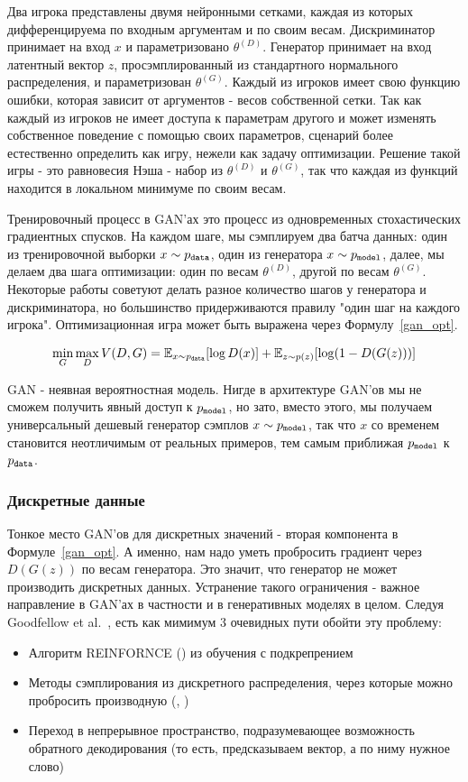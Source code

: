 \documentclass{spbau-diploma}
\begin{document}
Два игрока представлены двумя нейронными сетками, каждая из которых 
дифференцируема по входным аргументам и по своим весам. Дискриминатор принимает
на вход $x$ и параметризовано $\theta^{(D)}$. Генератор принимает на вход 
латентный вектор $z$, просэмплированный из стандартного нормального 
распределения, и параметризован $\theta^{(G)}$. Каждый из игроков имеет свою
функцию ошибки, которая зависит от аргументов - весов собственной сетки. Так как
каждый из игроков не имеет доступа к параметрам другого и может изменять 
собственное поведение с помощью своих параметров, сценарий более 
естественно определить как игру, нежели как задачу оптимизации. Решение такой
игры - это равновесия Нэша - набор из $\theta^{(D)}$ и $\theta^{(G)}$, так что
каждая из функций находится в локальном минимуме по своим весам.

Тренировочный процесс в GAN'ах это процесс из одновременных стохастических 
градиентных спусков. На каждом шаге, мы сэмплируем два батча данных: один из
тренировочной выборки $x \sim p_{\texttt{data}}$, один из генератора $x \sim p_{\texttt{model}}$, 
далее, мы делаем два шага оптимизации: один по весам $\theta^{(D)}$, другой 
по весам $\theta^{(G)}$. Некоторые работы советуют делать разное количество 
шагов у генератора и дискриминатора, но большинство придерживаются правилу "один
шаг на каждого игрока". Оптимизационная игра может быть выражена через 
Формулу~\ref{gan_opt}.

\begin{equation}
\label{gan_opt}
\min_G \max_D V(D, G) = \mathbb{E}_{x \sim p_{\texttt{data}}}{[\log{D(x)}]}
+ \mathbb{E}_{z \sim p(z)}{[\log(1 - D(G(z)))]}
\end{equation}

GAN - неявная вероятностная модель. Нигде в архитектуре GAN'ов мы не сможем 
получить явный доступ к $p_{\texttt{model}}$, но зато, вместо этого, мы получаем 
универсальный дешевый генератор сэмплов $x \sim p_{\texttt{model}}$, так что $x$ со 
временем становится неотличимым от реальных примеров, тем самым приближая 
$p_{\texttt{model}}$ к $p_{\texttt{data}}$.

\subsubsection{Дискретные данные}
Тонкое место GAN'ов для дискретных значений - вторая компонента в 
Формуле~\ref{gan_opt}. А именно, нам надо уметь пробросить градиент через 
$D(G(z))$ по весам генератора. Это значит, что генератор не может производить
дискретных данных. Устранение такого ограничения - важное направление в GAN'ах
в частности и в генеративных моделях в целом. 
Следуя Goodfellow et al.~\cite{1701.00160}, есть как мимимум 3 очевидных пути
обойти эту проблему:
\begin{itemize}
    \item Алгоритм REINFORNCE (\cite{reinforce}) из обучения с подкрепрением
    \item Методы сэмплирования из дискретного распределения, через которые можно
    пробросить производную (\cite{1611.00712}, \cite{1611.01144})
    \item Переход в непрерывное пространство, подразумевающее возможность 
    обратного декодирования (то есть, предсказываем вектор, а по ниму нужное
    слово)
\end{itemize}
\end{document}
